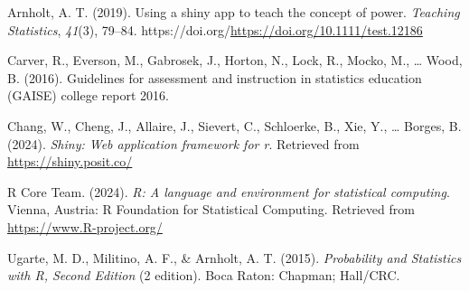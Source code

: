 \documentclass[
]{article}
\newlength{\cslhangindent}
\newlength{\cslentryspacingunit} %
\newenvironment{CSLReferences}[2] %
 {%
  \setlength{\parindent}{0pt}
  \ifodd #1
  \let\oldpar\par
  \def\par{\hangindent=\cslhangindent\oldpar}
  \fi
  \setlength{\parskip}{#2\cslentryspacingunit}
 }%
 {}
\begin{document}
\hypertarget{refs}{}
\begin{CSLReferences}{1}{0}
\leavevmode{}%
Arnholt, A. T. (2019). Using a shiny app to teach the concept of power. \emph{Teaching Statistics}, \emph{41}(3), 79--84. https://doi.org/\url{https://doi.org/10.1111/test.12186}

\leavevmode{}%
Carver, R., Everson, M., Gabrosek, J., Horton, N., Lock, R., Mocko, M., \ldots{} Wood, B. (2016). Guidelines for assessment and instruction in statistics education (GAISE) college report 2016.

\leavevmode{}%
Chang, W., Cheng, J., Allaire, J., Sievert, C., Schloerke, B., Xie, Y., \ldots{} Borges, B. (2024). \emph{Shiny: Web application framework for r}. Retrieved from \url{https://shiny.posit.co/}

\leavevmode{}%
R Core Team. (2024). \emph{R: A language and environment for statistical computing}. Vienna, Austria: R Foundation for Statistical Computing. Retrieved from \url{https://www.R-project.org/}

\leavevmode{}%
Ugarte, M. D., Militino, A. F., \& Arnholt, A. T. (2015). \emph{Probability and {Statistics} with {R}, {Second} {Edition}} (2 edition). Boca Raton: Chapman; Hall/CRC.

\end{CSLReferences}
\end{document}
